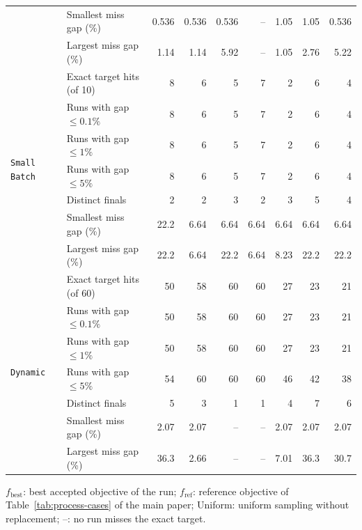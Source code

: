 \begin{table}[htbp]
\begin{threeparttable}
\begin{tabular}{@{}llrrrrrrr@{}}
 & Smallest miss gap (\%) & 0.536 & 0.536 & 0.536 & -- & 1.05 & 1.05 & 0.536 \\
 & Largest miss gap (\%) & 1.14 & 1.14 & 5.92 & -- & 1.05 & 2.76 & 5.22 \\
\midrule
\multirow{7}{*}{\texttt{Small Batch}} & Exact target hits (of 10) & 8 & 6 & 5 & 7 & 2 & 6 & 4 \\
 & Runs with gap \(\leq0.1\%\) & 8 & 6 & 5 & 7 & 2 & 6 & 4 \\
 & Runs with gap \(\leq1\%\) & 8 & 6 & 5 & 7 & 2 & 6 & 4 \\
 & Runs with gap \(\leq5\%\) & 8 & 6 & 5 & 7 & 2 & 6 & 4 \\
 & Distinct finals & 2 & 2 & 3 & 2 & 3 & 5 & 4 \\
 & Smallest miss gap (\%) & 22.2 & 6.64 & 6.64 & 6.64 & 6.64 & 6.64 & 6.64 \\
 & Largest miss gap (\%) & 22.2 & 6.64 & 22.2 & 6.64 & 8.23 & 22.2 & 22.2 \\
\midrule
\multirow{7}{*}{\texttt{Dynamic}} & Exact target hits (of 60) & 50 & 58 & 60 & 60 & 27 & 23 & 21 \\
 & Runs with gap \(\leq0.1\%\) & 50 & 58 & 60 & 60 & 27 & 23 & 21 \\
 & Runs with gap \(\leq1\%\) & 50 & 58 & 60 & 60 & 27 & 23 & 21 \\
 & Runs with gap \(\leq5\%\) & 54 & 60 & 60 & 60 & 46 & 42 & 38 \\
 & Distinct finals & 5 & 3 & 1 & 1 & 4 & 7 & 6 \\
 & Smallest miss gap (\%) & 2.07 & 2.07 & -- & -- & 2.07 & 2.07 & 2.07 \\
 & Largest miss gap (\%) & 36.3 & 2.66 & -- & -- & 7.01 & 36.3 & 30.7 \\
\bottomrule
\end{tabular}
\begin{tablenotes}[flushleft]\footnotesize
\item \(f_{\mathrm{best}}\): best accepted objective of the run; \(f_{\mathrm{ref}}\): reference objective of Table~\ifdefined\manuscriptwithsupplement\ref{tab:process-cases}\fi{} of the main paper; Uniform: uniform sampling without replacement; --: no run misses the exact target.
\end{tablenotes}
\end{threeparttable}
\end{table}

